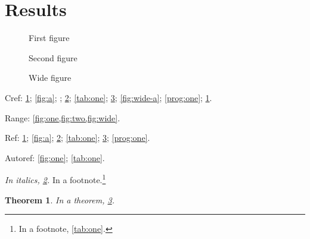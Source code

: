 \documentclass{article}
\newtheorem{theorem}{Theorem}
\begin{document}
\section{Results}\label{sec:res}
\begin{figure}[h]
  \centering
  \quad
  \caption{First figure}\label{fig:one}
\end{figure}
\begin{figure}[h]
  \centering
  \captionsetup{name=Fig.}
  \caption{Second figure}\label{fig:two}
\end{figure}
\begin{table}[h]
  \centering
  \caption{First table}\label{tab:one}
  \quad
\end{table}
\begin{figure}[h]
  \centering
  \caption{Wide figure}\label{fig:wide}
\end{figure}
\begin{program}[h]
  \capstart
  \caption{A program}\label{prog:one}
\end{program}

Cref: \cref{fig:one}; \cref{fig:a}; ; \cref{fig:two}; \cref{tab:one}; \cref{fig:wide}; \cref{fig:wide-a}; \cref{prog:one}; \cref{sec:res}.

Range: \cref{fig:one,fig:two,fig:wide}.

Ref: \ref{fig:one}; \ref{fig:a}; \ref{fig:two}; \ref{tab:one}; \ref{fig:wide}; \ref{prog:one}.

Autoref: \autoref{fig:one}; \autoref{tab:one}.

\emph{In italics, \cref{fig:two}.} In a footnote.\footnote{In a footnote, \cref{tab:one}.}

\begin{theorem}
In a theorem, \cref{fig:wide}.
\end{theorem}
\end{document}
